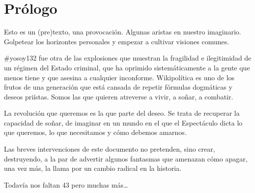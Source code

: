 \hypertarget{pruxf3logo}{%
\section{Prólogo}\label{pruxf3logo}}

Esto es un (pre)texto, una provocación. Algunas aristas en nuestro
imaginario. Golpetear los horizontes personales y empezar a cultivar
visiones comunes.

\#yosoy132 fue otra de las explosiones que muestran la fragilidad e
ilegitimidad de un régimen del Estado criminal, que ha oprimido
sistemáticamente a la gente que menos tiene y que asesina a cualquier
inconforme. Wikipolítica es uno de los frutos de una generación que está
cansada de repetir fórmulas dogmáticas y deseos priístas. Somos las que
quieren atreverse a vivir, a soñar, a combatir.

La revolución que queremos es la que parte del deseo. Se trata de
recuperar la capacidad de soñar, de imaginar en un mundo en el que el
Espectáculo dicta lo que queremos, lo que necesitamos y cómo debemos
amarnos.

Las breves intervenciones de este documento no pretenden, sino crear,
destruyendo, a la par de advertir algunos fantasmas que amenazan cómo
apagar, una vez más, la llama por un cambio radical en la historia.

Todavía nos faltan 43 pero muchas más\ldots{}
